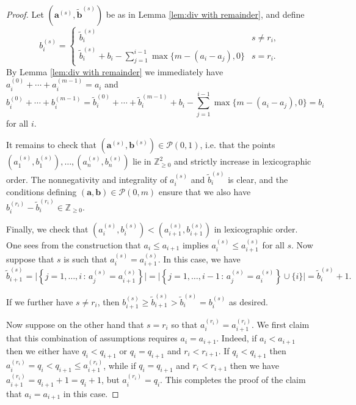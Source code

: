 \documentclass[12pt]{amsart}
\newcommand{\Z}{\mathbb{Z}}
\newcommand{\aaa}{\mathbf{a}}
\newcommand{\bbb}{\mathbf{b}}
\numberwithin{equation}{section}
\theoremstyle{definition}
\begin{document}
\begin{proof}
    Let $\left(\aaa^{(s)},\tilde{\bbb}^{(s)}\right)$ be as in Lemma \ref{lem:div with remainder}, and define
    \[ b^{(s)}_i = \begin{cases}
        \tilde{b}^{(s)}_i & s\neq r_i,\\
        \tilde{b}^{(s)}_i + b_i- \sum_{j=1}^{i-1}\max\{m-(a_i-a_j),0\} & s=r_i.
    \end{cases} \]
    By Lemma \ref{lem:div with remainder} we immediately have $a^{(0)}_i+\cdots+a^{(m-1)}_i = a_i$ and 
    \[ b^{(0)}_i+\cdots+b^{(m-1)}_i = \tilde{b}^{(0)}_i+\cdots+\tilde{b}^{(m-1)}_i + b_i- \sum_{j=1}^{i-1}\max\{m-(a_i-a_j),0\} =b_i \]
    for all $i$.  
    
    It remains to check that $\left(\aaa^{(s)},\bbb^{(s)}\right)\in \mathcal{P}(0,1)$, i.e. that the points $\left(a^{(s)}_1,b^{(s)}_1\right),\dots,\left(a^{(s)}_n,b^{(s)}_n\right)$ lie in $\Z^2_{\geq 0}$ and strictly increase in lexicographic order. The nonnegativity and integrality of $a^{(s)}_i$ and $\tilde{b}^{(s)}_i$ is clear, and the conditions defining $(\aaa,\bbb)\in \mathcal{P}(0,m)$ ensure that we also have $b^{(r_i)}_i -\tilde{b}^{(r_i)}_i \in \Z_{\geq 0}.$

    Finally, we check that $\left(a^{(s)}_i,b^{(s)}_i\right)<\left(a^{(s)}_{i+1},b^{(s)}_{i+1}\right)$ in lexicographic order. One sees from the construction that $a_i\leq a_{i+1}$ implies $a_i^{(s)}\leq a_{i+1}^{(s)}$ for all $s$. Now suppose that $s$ is such that $a_i^{(s)}= a_{i+1}^{(s)}$. In this case, we have 
    \[ \tilde{b}^{(s)}_{i+1} = \big|\left\{ j=1,\dots,i \, : \, a^{(s)}_j = a^{(s)}_{i+1} \right\}\big| = \big|\left\{ j=1,\dots,i-1 \, : \, a^{(s)}_j = a^{(s)}_{i} \right\}\cup \{i\} \big| = \tilde{b}^{(s)}_{i}+1. \]
    
    If we further have $s\neq r_i$, then $b^{(s)}_{i+1}\geq \tilde{b}^{(s)}_{i+1}> \tilde{b}^{(s)}_{i} = b^{(s)}_{i}$ as desired. 

    Now suppose on the other hand that $s=r_i$ so that $a_i^{(r_i)}= a_{i+1}^{(r_i)}$. We first claim that this combination of assumptions requires $a_i=a_{i+1}$. Indeed, if $a_i<a_{i+1}$ then we either have $q_i<q_{i+1}$ or $q_i=q_{i+1}$ and $r_i<r_{i+1}$. If $q_i<q_{i+1}$ then $a_i^{(r_i)} = q_i<q_{i+1}\leq a_{i+1}^{(r_i)}$, while if $q_i=q_{i+1}$ and $r_i<r_{i+1}$ then we have $a^{(r_i)}_{i+1} = q_{i+1}+1=q_i+1$, but $a^{(r_i)}_i = q_i$. This completes the proof of the claim that $a_i=a_{i+1}$ in this case.


\end{proof}
\end{document}
